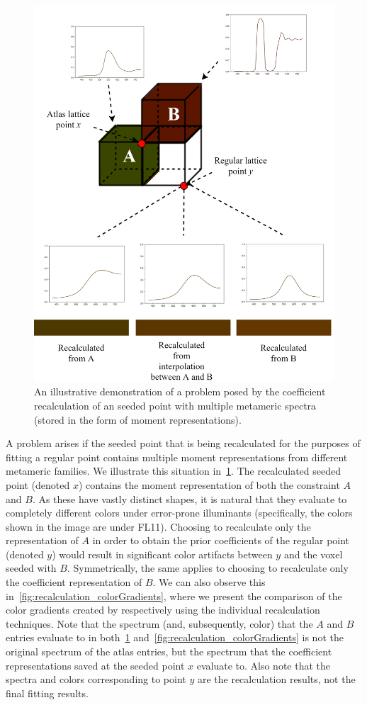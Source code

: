 \begin{figure}[t!]
	\centering
	\captionsetup[subfigure]{font=footnotesize,labelfont=footnotesize}
	\includegraphics[width=0.8\linewidth]{img/recalculation.png}
	\caption{An illustrative demonstration of a problem posed by the coefficient recalculation of an seeded point with multiple metameric spectra (stored in the form of moment representations).}
	\label{fig:recalculation_process}
\end{figure}

A problem arises if the seeded point that is being recalculated for the purposes of fitting a regular point contains multiple moment representations from different metameric families. We illustrate this situation in~\cref{fig:recalculation_process}. The recalculated seeded point (denoted $x$) contains the moment representation of both the constraint $A$ and $B$. As these have vastly distinct shapes, it is natural that they evaluate to completely different colors under error-prone illuminants (specifically, the colors shown in the image are under FL11). Choosing to recalculate only the representation of $A$ in order to obtain the prior coefficients of the regular point (denoted $y$) would result in significant color artifacts between $y$ and the voxel seeded with $B$. Symmetrically, the same applies to choosing to recalculate only the coefficient representation of $B$. We can also observe this in~\cref{fig:recalculation_colorGradients}, where we present the comparison of the color gradients created by respectively using the individual recalculation techniques. Note that the spectrum (and, subsequently, color) that the $A$ and $B$ entries evaluate to in both~\cref{fig:recalculation_process} and~\cref{fig:recalculation_colorGradients} is not the original spectrum of the atlas entries, but the spectrum that the coefficient representations saved at the seeded point $x$ evaluate to. Also note that the spectra and colors corresponding to point $y$ are the recalculation results, not the final fitting results.


